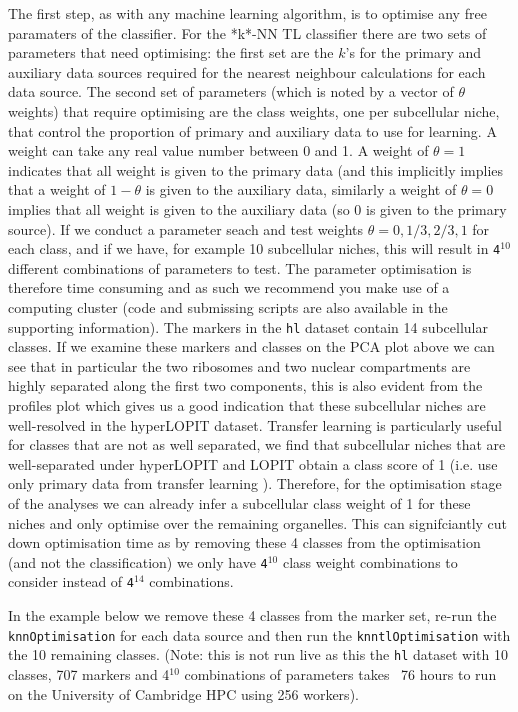 The first step, as with any machine learning algorithm, is to optimise
any free paramaters of the classifier. For the *k*-NN TL classifier
there are two sets of parameters that need optimising: the first set
are the $k$'s for the primary and auxiliary data sources required for
the nearest neighbour calculations for each data source. The second
set of parameters (which is noted by a vector of $\theta$ weights)
that require optimising are the class weights, one per subcellular
niche, that control the proportion of primary and auxiliary data to
use for learning. A weight can take any real value number between 0
and 1. A weight of $\theta = 1$ indicates that all weight is given to
the primary data (and this implicitly implies that a weight of
$1 - \theta$ is given to the auxiliary data, similarly a weight of
$\theta = 0$ implies that all weight is given to the auxiliary data
(so 0 is given to the primary source). If we conduct a parameter seach
and test weights $\theta = {0, 1/3, 2/3, 1}$ for each class, and if we
have, for example 10 subcellular niches, this will result in
\texttt{4$^{10}$} different combinations of parameters to test. The
parameter optimisation is therefore time consuming and as such we
recommend you make use of a computing cluster (code and submissing
scripts are also available in the supporting information). The markers
in the \texttt{hl} dataset contain 14 subcellular classes. If we
examine these markers and classes on the PCA plot above we can see
that in particular the two ribosomes and two nuclear compartments are
highly separated along the first two components, this is also evident
from the profiles plot which gives us a good indication that these
subcellular niches are well-resolved in the hyperLOPIT
dataset. Transfer learning is particularly useful for classes that are
not as well separated, we find that subcellular niches that are
well-separated under hyperLOPIT and LOPIT obtain a class score of 1
(i.e. use only primary data from transfer learning
\cite{Breckels:2016}). Therefore, for the optimisation stage of the
analyses we can already infer a subcellular class weight of 1 for
these niches and only optimise over the remaining organelles.  This
can signifciantly cut down optimisation time as by removing these 4
classes from the optimisation (and not the classification) we only
have \texttt{4$^{10}$} class weight combinations to consider instead
of \texttt{4$^{14}$} combinations.

In the example below we remove these 4 classes from the marker set,
re-run the \texttt{knnOptimisation} for each data source and then run
the \texttt{knntlOptimisation} with the 10 remaining classes. (Note:
this is not run live as this the \texttt{hl} dataset with 10 classes,
707 markers and 4$^{10}$ combinations of parameters takes ~76 hours to
run on the University of Cambridge HPC using 256 workers).


